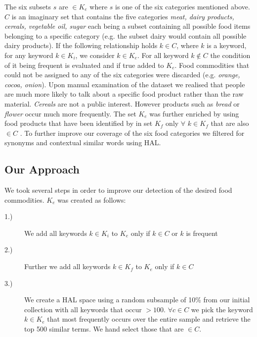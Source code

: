 \documentclass[12pt]{report}
\begin{document}
The six subsets  $s$ are $\in K_e$ where $s$ is one of the six categories mentioned above. $C$ is an imaginary set that contains the five categories \emph{meat, dairy products, cereals, vegetable oil, sugar}  each being a subset containing all possible food items belonging to a specific category (e.g. the subset dairy would contain all possible dairy products). If the following relationship holds  $k \in C$, where $k$ is a keyword, for any keyword $k \in K_i$, we consider $k \in K_e$. For all keyword $k \notin C$ the condition of it being frequent is evaluated and if true added to $K_e$.  Food commodities that could not be assigned to any of the six categories were discarded (e.g. \emph {orange, cocoa, onion}). Upon manual examination of the dataset we realised that people are much more likely to talk about a specific food product rather than the raw material. \emph{Cereals} are not a public interest. However products such as \emph{bread} or \emph {flower} occur much more frequently. The set $K_e$  was further enriched by using food products that have been identified by \cite{AbbarMW14} in set $K_f$ only $\forall$ $k   \in K_f$ that are also $\in C$ . To further improve our coverage of the six food categories we filtered for synonyms and contextual similar words using HAL. 
\subsection{Our Approach}

We took several  steps in order to improve our detection of the desired food commodities. $K_e$ was created as follows: 
\begin{description}
  \item[1.)] We add all keywords $k \in K_i$ to  $K_e$ only if $k \in C $ or $k$ is frequent 
  \item[2.)] Further we add all keywords $ k \in K_f$ to $K_e$ only if $k \in C$
  \item[3.)] We create a HAL space using a random subsample of 10\% from our initial collection with all keywords that occur $> 100$. $\forall c \in C $ we pick the keyword $k\in K_e$ that most frequently occurs over the entire sample and retrieve the top 500 similar terms. We hand select those that are $\in C$.
\end{description}

 
\end{document}
